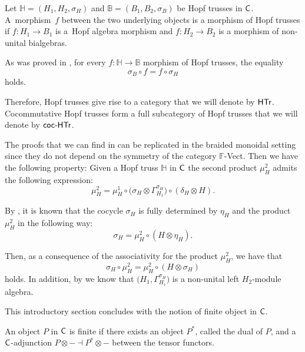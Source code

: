 \documentclass[10pt,a4paper]{amsart}
\numberwithin{equation}{section}
\begin{document}
\begin{Definition}
Let $\mathbb{H}=(H_{1},H_{2},\sigma_{H})$ and $\mathbb{B}=(B_{1},B_{2},\sigma_{B})$ be Hopf trusses in $\sf{C}$. A~morphism~$f$ between the two underlying objects is a morphism of Hopf trusses if $f\colon H_{1}\rightarrow B_{1}$ is a~Hopf algebra morphism and $f\colon H_{2}\rightarrow B_{2}$ is a morphism of non-unital bialgebras.

As was proved in \cite[Proposition 6.8]{BRZ1}, for every $f\colon \mathbb{H}\rightarrow \mathbb{B}$ morphism of Hopf trusses, the equality
\begin{equation}\label{Cond mor truss}
\sigma_{B}\circ f=f\circ \sigma_{H}
\end{equation}
holds.
\end{Definition}
Therefore, Hopf trusses give rise to a category that we will denote by $\sf{HTr}$. Cocommutative Hopf trusses form a full subcategory of Hopf trusses that we will denote by $\sf{coc}\textnormal{-}{\sf HTr}$.

The proofs that we can find in \cite[Section 6]{BRZ1} can be replicated in the braided monoidal setting since they do not depend on the symmetry of the category ${\mathbb F}$-{\sf Vect}. Then we have the following property: Given a Hopf truss $\mathbb{H}$ in $\sf{C}$ the second product $\mu_{H}^{2}$ admits the following expression:
\begin{equation}\label{mu2Htruss}
\mu_{H}^{2}=\mu_{H}^{1}\circ\bigl(\sigma_{H}\otimes\Gamma_{H_{1}}^{\sigma_{H}}\bigr)\circ(\delta_{H}\otimes H).
\end{equation}

By \cite[Lemma 6.2]{BRZ1}, it is known that the cocycle $\sigma_{H}$ is fully determined by $\eta_{H}$ and the product~$\mu_{H}^{2}$ in the following way:
\begin{equation*}%
\sigma_{H}=\mu_{H}^{2}\circ(H\otimes\eta_{H}).
\end{equation*}

Then, as a consequence of the associativity for the product $\mu_{H}^{2}$, we have that
\begin{equation}\label{cocycle truss 2}
\sigma_{H}\circ\mu_{H}^{2}=\mu_{H}^{2}\circ(H\otimes\sigma_{H})
\end{equation}
holds. In addition, by \cite[Theorem 6.5]{BRZ1} we know that $\bigl(H_{1},\Gamma_{H_{1}}^{\sigma_{H}}\bigr)$ is a non-unital left $H_{2}$-module algebra.

This introductory section concludes with the notion of finite object in $\sf{C}$.
\begin{Definition}%
An object $P$ in $\sf{C}$ is finite if there exists an object $P^{\ast}$, called the dual of $P$, and a $\sf{C}$-adjunction $P\otimes -\dashv P^{\ast}\otimes -$ between the tensor functors.
\end{Definition}
\end{document}
